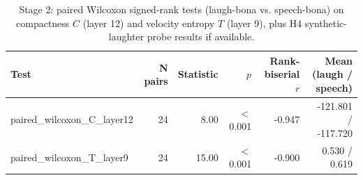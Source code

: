 \begin{table}[t]
\centering
\caption{Stage 2: paired Wilcoxon signed-rank tests (laugh-bona vs. speech-bona) on compactness $C$ (layer 12) and velocity entropy $T$ (layer 9), plus H4 synthetic-laughter probe results if available.}
\label{tab:table2}
\begin{tabular}{lrrrrr}
\toprule
Test & N pairs & Statistic & $p$ & Rank-biserial $r$ & Mean (laugh / speech) \\
\midrule
paired\_wilcoxon\_C\_layer12 & 24 & 8.00 & $<$0.001 & -0.947 & -121.801 / -117.720 \\
paired\_wilcoxon\_T\_layer9 & 24 & 15.00 & $<$0.001 & -0.900 & 0.530 / 0.619 \\
\bottomrule
\end{tabular}
\end{table}
